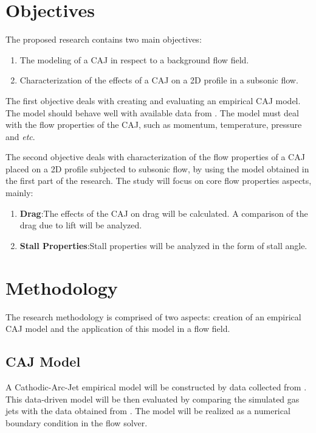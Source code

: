 \documentclass[10pt,a4paper]{article}
\begin{document}
\section{Objectives}
The proposed research contains two main objectives:
\begin{enumerate}
    \item The modeling of a CAJ in respect to a background flow field.
    \item Characterization of the effects of a CAJ on a 2D profile in a subsonic flow.
\end{enumerate}
The first objective deals with creating and evaluating an empirical CAJ model. The model should behave well with available data from \cite{1}. The model must deal with the flow properties of the CAJ, such as momentum, temperature, pressure and \textit{etc}.
\par The second objective deals with characterization of the flow properties of a CAJ placed on a 2D profile subjected to subsonic flow, by using the model obtained in the first part of the research. The study will focus on core flow properties aspects, mainly: 
\begin{enumerate}
   	\item \textbf{Drag}:\quad The effects of the CAJ on drag will be calculated. A comparison of the drag due to lift will be analyzed.
	\item \textbf{Stall Properties}:\quad Stall properties will be analyzed in the form of stall angle.
\end{enumerate}
\section{Methodology}
The research methodology is comprised of two aspects: creation of an empirical CAJ model and the application of this model in a flow field.
\subsection{CAJ Model}
A Cathodic-Arc-Jet empirical model will be constructed by data collected from \cite{1}. This data-driven model will be then evaluated by comparing the simulated gas jets with the data obtained from \cite{1}. The model will be realized as a numerical boundary condition in the flow solver.
\end{document}
